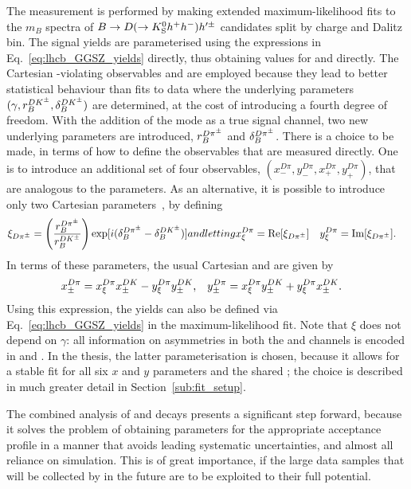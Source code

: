 The measurement is performed by making extended maximum-likelihood fits to the $m_B$ spectra of ${B}\rightarrow{\ensuremath{D}}(\rightarrow{\ensuremath{{K}^0_{\mathrm{S}}}} h^+h^-)h'^\pm$ candidates split by charge and Dalitz bin. The \BtoDK signal yields are parameterised using the expressions in Eq.~\eqref{eq:lhcb_GGSZ_yields} directly, thus obtaining values for \xpmdk and \ypmdk directly. The Cartesian \CP-violating observables \xpm and \ypm are employed because they lead to better statistical behaviour than fits to data where the underlying parameters $(\gamma, r_B^{{D}{{K}^\pm}}, \delta_B^{{D}{{K}^\pm}})$ are determined, at the cost of introducing a fourth degree of freedom. With the addition of the \BtoDpi mode as a true signal channel, two new underlying parameters are introduced, $r_B^{{{D}{{\pi}^\pm}}}$ and $\delta_B^{{{D}{{\pi}^\pm}}}$. There is a choice to be made, in terms of how to define the observables that are measured directly. One is to introduce an additional set of four observables, $(x_-^{D\pi}, y_-^{D\pi}, x_+^{D\pi}, y_+^{D\pi})$, that are analogous to the \BtoDK parameters. As an alternative, it is possible to introduce only two Cartesian parameters~\cite{Tico:2018qmg}, by defining
\begin{subequations}
\begin{align}
    \xi_{\DPi} = \left(\frac{r_B^{\DPi}}{r_B^{\DK}}\right)\exp [i (\delta_B^{\DPi}-\delta_B^{\DK})]
\end{align}
and letting
\begin{align}
    \xxidpi &= \Re [\xi_{\Dpi}] & \yxidpi &= \Im [\xi_{\Dpi}].
\end{align}
\end{subequations}
In terms of these parameters, the usual Cartesian \xpm and \ypm are given by
\begin{align}\label{eq:xy_from_xi}
    x_\pm^{{D}\pi} &= x_\xi^{{D}\pi}x_\pm^{DK} - y_\xi^{{D}\pi}y_\pm^{DK}, 
    & y_\pm^{{D}\pi} &= x_\xi^{{D}\pi}y_\pm^{DK} + y_\xi^{{D}\pi}x_\pm^{DK}.
\end{align} 
Using this expression, the \BtoDpi yields can also be defined via Eq.~\eqref{eq:lhcb_GGSZ_yields} in the maximum-likelihood fit. Note that $\xi$ does not depend on $\gamma$: all information on \CP asymmetries in both the \BtoDK and \BtoDpi channels is encoded in \xpmdk and \ypmdk. In the thesis, the latter parameterisation is chosen, because it allows for a stable fit for all six $x$ and $y$ parameters and the shared \Fi; the choice is described in much greater detail in Section~\ref{sub:fit_setup}. 

The combined analysis of \BtoDK and \BtoDpi decays presents a significant step forward, because it solves the problem of obtaining \Fi parameters for the appropriate acceptance profile in a manner that avoids leading systematic uncertainties, and almost all reliance on simulation. This is of great importance, if the large data samples that will be collected by \lhcb in the future are to be exploited to their full potential.







